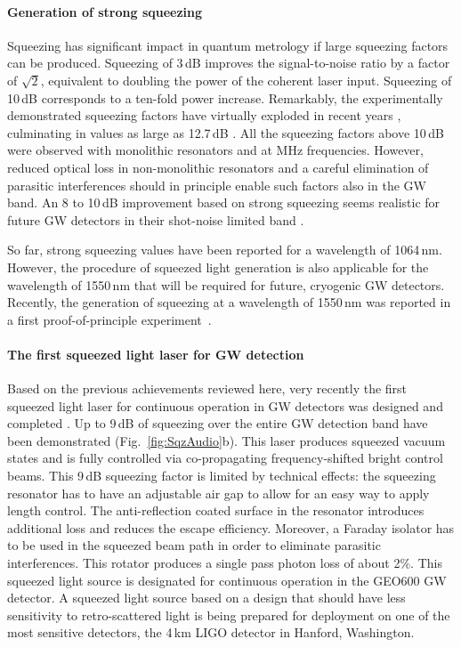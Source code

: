 \paragraph{Generation of strong squeezing}\; Squeezing has significant
impact in quantum metrology if large squeezing factors can be
produced. Squeezing of 3\,dB improves the signal-to-noise ratio by a
factor of $\sqrt{2}$, equivalent to doubling the power of the
coherent laser input. Squeezing of 10\,dB corresponds to a ten-fold
power increase. Remarkably, the experimentally demonstrated
squeezing factors have virtually exploded in recent years
\cite{Takeno2007,Vahlbruch2008,Polzik2008}, culminating in values
as large as 12.7\,dB \cite{Eberle2010}.
All the squeezing factors above
10\,dB were observed with monolithic resonators and at MHz
frequencies. However, reduced optical loss in non-monolithic resonators and a careful elimination of
parasitic interferences should in principle enable such factors
also in the GW band.  An 8 to 10\,dB improvement based on strong squeezing seems
realistic for future GW detectors in their shot-noise limited band \cite{Eberle2010}.

So far, strong squeezing values have been reported for a wavelength of 1064\,nm. However, the procedure of squeezed light generation is also applicable for the wavelength of 1550\,nm that will be required for future, cryogenic GW detectors.
Recently, the generation of  squeezing at a wavelength of 1550\,nm  was reported in a first proof-of-principle experiment~\cite{Mehmet2009}.


\paragraph{The first squeezed light laser for GW detection}\; Based on
the previous achievements reviewed here, very recently the first
squeezed light laser for continuous operation in GW detectors was
designed and completed \cite{VahlbruchPhD08,VahlbruchCQG2010}. Up to
9\,dB of squeezing over the entire GW detection band have been
demonstrated (Fig.~\ref{fig:SqzAudio}b). This laser produces squeezed vacuum
states and is fully controlled via co-propagating frequency-shifted bright control
beams. This 9\,dB squeezing factor is limited by technical effects:
the squeezing resonator has to have an adjustable air gap to allow
for an easy way to apply length control. The anti-reflection coated surface
in the resonator introduces additional loss and reduces the escape
efficiency. Moreover, a Faraday isolator has to be used in the
squeezed beam path in order to eliminate parasitic interferences.
This rotator produces a single pass photon loss of about 2\%. This
squeezed light source is designated for continuous operation in the
GEO600 GW detector. A squeezed light source based on a design that should have less sensitivity to retro-scattered light \cite{McKenzie2006} is being prepared for deployment on one of the most sensitive
detectors, the 4\,km LIGO detector in Hanford, Washington.

